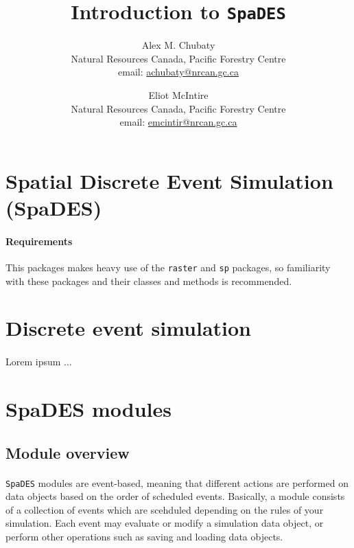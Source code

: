 \documentclass{article}
\title{Introduction to \texttt{SpaDES}}
\author{
  Alex M. Chubaty\\
	\small{Natural Resources Canada, Pacific Forestry Centre}\\
	\small{email: \href{mailto:achubaty@nrcan.gc.ca}{achubaty@nrcan.gc.ca}}
	\and
	Eliot McIntire\\
	\small{Natural Resources Canada, Pacific Forestry Centre}\\
	\small{email: \href{mailto:emcintir@nrcan.gc.ca}{emcintir@nrcan.gc.ca}}
}
\begin{document}


\maketitle

\tableofcontents

\newpage

\section{Spatial Discrete Event Simulation (SpaDES)}

\paragraph{Requirements}
This packages makes heavy use of the \texttt{raster} and \texttt{sp} packages, so familiarity with these packages and their classes and methods is recommended.


\newpage

\section{Discrete event simulation}

\paragraph{}
Lorem ipsum ...

\newpage

\section{SpaDES modules}

\subsection{Module overview}

\paragraph{}
\texttt{SpaDES} modules are event-based, meaning that different actions are performed on data objects based on the order of scheduled events. Basically, a module consists of a collection of events which are scehduled depending on the rules of your simulation. Each event may evaluate or modify a simulation data object, or perform other operations such as saving and loading data objects.
\end{document}
